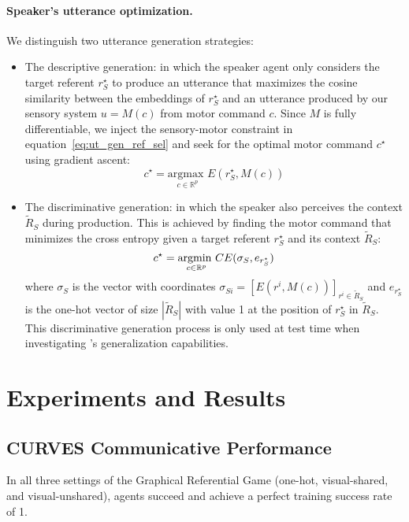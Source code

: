 \paragraph{Speaker's utterance optimization. } We distinguish two utterance generation strategies:
\begin{itemize}[noitemsep]
    \item The descriptive generation: in which the speaker agent only considers the target referent $r_S^\star$ to produce an utterance that maximizes the cosine similarity between the embeddings of $r_S^\star$ and an utterance produced by our sensory system $u = M(c)$ from motor command $c$. Since $M$ is fully differentiable, we inject the sensory-motor constraint in equation~\ref{eq:ut_gen_ref_sel} and seek for the optimal motor command $c^\star$ using gradient ascent:
\begin{equation}
c^\star = \underset{c \in \mathbb{R}^p}{\textrm{argmax }} E(r^\star_S, M(c))
\label{eq:descri_gen}
\end{equation}
    \item The discriminative generation: in which the speaker also perceives the context $\tilde{R}_S$ during production. This is achieved by finding the motor command that minimizes the cross entropy given a target referent $r^\star_S$ and its context $\tilde{R}_S$:
\begin{equation}
    c^\star = \underset{c\in \mathbb{R} ^p}{\textrm{argmin }} CE( \sigma_S, e_{r^\star_S})
    \label{eq:discri_gen}
\end{equation}
%
where $\sigma_S$ is the vector with coordinates $\sigma_{Si} = [E(r^i, M(c))]_{r^i\in \tilde{R}_S}$ and $e_{r^\star_S}$ is the one-hot vector of size $|\tilde{R}_S|$ with value 1 at the position of $r^\star_S$ in $\tilde{R}_S$. This discriminative generation process is only used at test time when investigating \curves's generalization capabilities. 
\end{itemize}

\section{Experiments and Results}

\subsection{CURVES Communicative Performance}
\label{sec:results_perf}


 In all three settings of the Graphical Referential Game (one-hot, visual-shared, and visual-unshared), agents succeed and achieve a perfect training success rate of 1.



